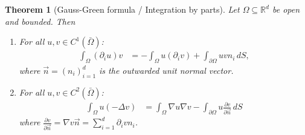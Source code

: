 \documentclass{report}
\theoremstyle{tommy}
\newtheorem{thm}[defn]{Theorem}
\begin{document}
  \begin{thm}[Gauss-Green formula / Integration by parts]
    Let \(\Omega \subseteq \mathbb{R}^d\) be open and bounded. Then
    \begin{enumerate}
      \item For all \(u, v \in C^1(\bar \Omega)\):
      \begin{align*}
        \int_\Omega (\partial_i u) v &= - \int_\Omega u(\partial_i v) + \int_{\partial \Omega} uv n_i \, dS,
      \end{align*}
      where \(\vec{n} = (n_i)_{i=1}^d\) is the outwarded unit normal vector.
    \item For all \(u,v \in C^2(\bar \Omega)\):
    \begin{align*}
      \int_\Omega u(-\Delta v) &= \int_\Omega \nabla u \nabla v - \int_{\partial \Omega} u \frac{\partial v}{\partial \vec{n}} \, dS
    \end{align*}
    where \(\frac{\partial v}{\partial \vec{n}} = \nabla v \vec{n} = \sum_{i=1}^d \partial_i v n_i\). 
  \end{enumerate}
  \end{thm}
\end{document}
